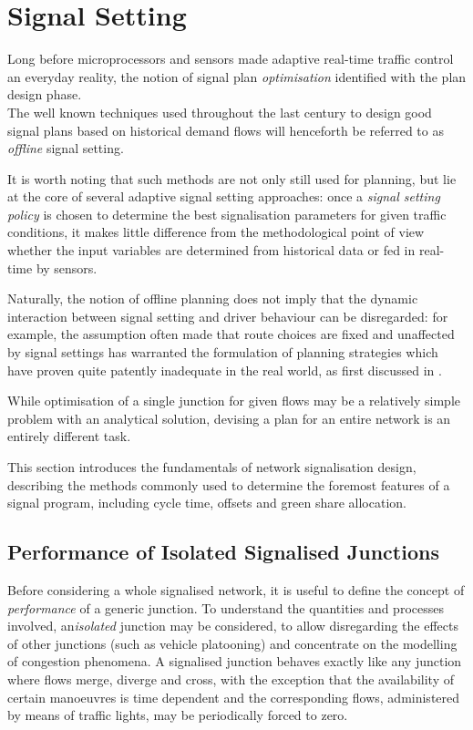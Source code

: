 \section{Signal Setting} \label{s:signalsetting}
Long before microprocessors and sensors made adaptive real-time traffic control an everyday reality, the notion of signal plan \emph{optimisation} identified with the plan design phase.\\
The well known techniques used throughout the last century to design good signal plans based on historical demand flows will henceforth be referred to as \emph{offline} signal setting.

It is worth noting that such methods are not only still used for planning, but lie at the core of several adaptive signal setting approaches: once a \emph{signal setting policy} is chosen to determine the best signalisation parameters for given traffic conditions, it makes little difference from the methodological point of view whether the input variables are determined from historical data or fed in real-time by sensors. 

Naturally, the notion of offline planning does not imply that the dynamic interaction between signal setting and driver behaviour can be disregarded: for example, the assumption often made that route choices are fixed and unaffected by signal settings has warranted the formulation of planning strategies which have proven quite patently inadequate in the real world, as first discussed in \citep{dickson1981note}.

While optimisation of a single junction for given flows may be a relatively simple problem with an analytical solution, devising a plan for an entire network is an entirely different task.

This section introduces the fundamentals of network signalisation design, describing the methods commonly used to determine the foremost features of a signal program, including cycle time, offsets and green share allocation.

\subsection{Performance of Isolated Signalised Junctions} \label{s:performance}
Before considering a whole signalised network, it is useful to define the concept of \emph{performance} of a generic junction. To understand the quantities and processes involved, an\emph{isolated} junction may be considered, to allow disregarding the effects of other junctions (such as vehicle platooning) and concentrate on the modelling of congestion phenomena. 
A signalised junction behaves exactly like any junction where flows merge, diverge and cross, with the exception that the availability of certain manoeuvres is time dependent and the corresponding flows, administered by means of traffic lights, may be periodically forced to zero.

